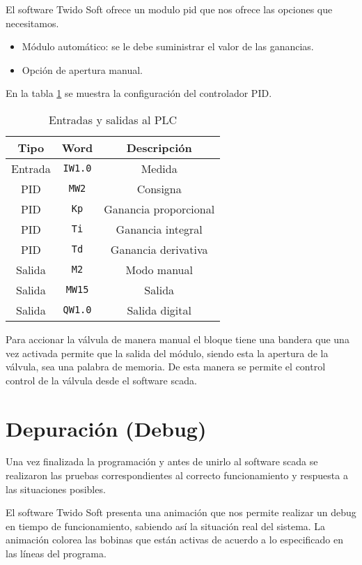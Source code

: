 El software Twido Soft ofrece un modulo \gls{pid} que nos ofrece las
opciones que necesitamos.

\begin{itemize}
 \item Módulo automático: se le debe suministrar el valor de las ganancias. 
 \item Opción de apertura manual.
\end{itemize}

En la tabla \ref{table:controladorpid} se muestra la configuración del 
controlador PID.

\begin{table}[!t]

\renewcommand{\arraystretch}{1.3}
\centering
\begin{tabular}{c||c||c}
\hline
\bfseries Tipo & \bfseries Word  & \bfseries Descripción\\
\hline \hline
Entrada & \verb|IW1.0|  & Medida\\
\hline
PID & \verb|MW2|  & Consigna\\
PID & \verb|Kp|  & Ganancia proporcional\\
PID & \verb|Ti|  & Ganancia integral\\
PID & \verb|Td|  & Ganancia derivativa\\
\hline
Salida & \verb|M2|  & Modo manual\\
Salida & \verb|MW15|  & Salida\\
Salida & \verb|QW1.0|  & Salida digital\\
\hline
\end{tabular}
\caption{Entradas y salidas al PLC}
\label{table:controladorpid}
\end{table}

Para accionar la válvula de manera manual el bloque tiene una bandera
que una vez activada permite que la salida del módulo, siendo esta la 
apertura de la válvula, sea una palabra de memoria. De esta manera se 
permite el control control de la válvula desde el software \gls{scada}.


\section{Depuración (Debug)}
\label{sec:Debug}


Una vez finalizada la programación y antes de unirlo al software \gls{scada} 
se realizaron las pruebas correspondientes al correcto funcionamiento y respuesta
a las situaciones posibles. 

El software Twido Soft presenta una animación que nos permite realizar un debug en
tiempo de funcionamiento, sabiendo así la situación real del sistema. 
La animación colorea las bobinas que están activas de acuerdo a lo especificado
en las líneas del programa.

